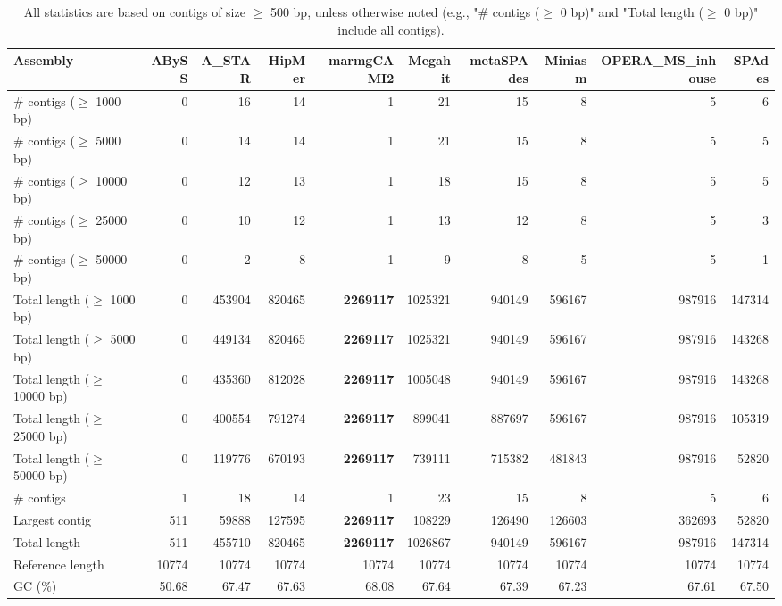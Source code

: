 \documentclass[12pt,a4paper]{article}
\begin{document}
\begin{table}[ht]
\begin{center}
\caption{All statistics are based on contigs of size $\geq$ 500 bp, unless otherwise noted (e.g., "\# contigs ($\geq$ 0 bp)" and "Total length ($\geq$ 0 bp)" include all contigs).}
\begin{tabular}{|l*{9}{|r}|}
\hline
Assembly & ABySS & A\_STAR & HipMer & marmgCAMI2 & Megahit & metaSPAdes & Miniasm & OPERA\_MS\_inhouse & SPAdes \\ \hline
\# contigs ($\geq$ 1000 bp) & 0 & 16 & 14 & 1 & 21 & 15 & 8 & 5 & 6 \\ \hline
\# contigs ($\geq$ 5000 bp) & 0 & 14 & 14 & 1 & 21 & 15 & 8 & 5 & 5 \\ \hline
\# contigs ($\geq$ 10000 bp) & 0 & 12 & 13 & 1 & 18 & 15 & 8 & 5 & 5 \\ \hline
\# contigs ($\geq$ 25000 bp) & 0 & 10 & 12 & 1 & 13 & 12 & 8 & 5 & 3 \\ \hline
\# contigs ($\geq$ 50000 bp) & 0 & 2 & 8 & 1 & 9 & 8 & 5 & 5 & 1 \\ \hline
Total length ($\geq$ 1000 bp) & 0 & 453904 & 820465 & {\bf 2269117} & 1025321 & 940149 & 596167 & 987916 & 147314 \\ \hline
Total length ($\geq$ 5000 bp) & 0 & 449134 & 820465 & {\bf 2269117} & 1025321 & 940149 & 596167 & 987916 & 143268 \\ \hline
Total length ($\geq$ 10000 bp) & 0 & 435360 & 812028 & {\bf 2269117} & 1005048 & 940149 & 596167 & 987916 & 143268 \\ \hline
Total length ($\geq$ 25000 bp) & 0 & 400554 & 791274 & {\bf 2269117} & 899041 & 887697 & 596167 & 987916 & 105319 \\ \hline
Total length ($\geq$ 50000 bp) & 0 & 119776 & 670193 & {\bf 2269117} & 739111 & 715382 & 481843 & 987916 & 52820 \\ \hline
\# contigs & 1 & 18 & 14 & 1 & 23 & 15 & 8 & 5 & 6 \\ \hline
Largest contig & 511 & 59888 & 127595 & {\bf 2269117} & 108229 & 126490 & 126603 & 362693 & 52820 \\ \hline
Total length & 511 & 455710 & 820465 & {\bf 2269117} & 1026867 & 940149 & 596167 & 987916 & 147314 \\ \hline
Reference length & 10774 & 10774 & 10774 & 10774 & 10774 & 10774 & 10774 & 10774 & 10774 \\ \hline
GC (\%) & 50.68 & 67.47 & 67.63 & 68.08 & 67.64 & 67.39 & 67.23 & 67.61 & 67.50 \\ \hline

\end{tabular}
\end{center}
\end{table}
\end{document}
